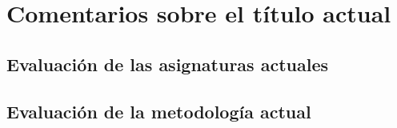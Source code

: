 \chapter{Comentarios sobre el título actual}\label{chap:analysis}


\section{Evaluación de las asignaturas actuales}

\section{Evaluación de la metodología actual}
